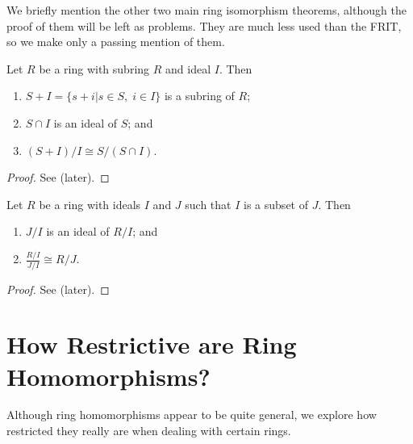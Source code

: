 We briefly mention the other two main ring isomorphism theorems, although the proof of them will be left as problems. They are much less used than the FRIT, so we make only a passing mention of them.
\begin{theorem}\label{thrm-ring-isomorphism-2}
    Let $R$ be a ring with subring $R$ and ideal $I$. Then
    \begin{enumerate}
        \item $S+I = \{s+i \vert s\in S,\;i\in I\}$ is a subring of $R$;
        \item $S \cap I$ is an ideal of $S$; and
        \item $(S+I)/I \cong S/(S\cap I)$.
    \end{enumerate}
\end{theorem}
\begin{proof}
    See  (later).
\end{proof}

\begin{theorem}\label{thrm-ring-isomorphism-3}
    Let $R$ be a ring with ideals $I$ and $J$ such that $I$ is a subset of $J$. Then
    \begin{enumerate}
        \item $J/I$ is an ideal of $R/I$; and
        \item $\frac{R/I}{J/I} \cong R/J$.
    \end{enumerate}
\end{theorem}
\begin{proof}
    See  (later).
\end{proof}

\section{How Restrictive are Ring Homomorphisms?}
Although ring homomorphisms appear to be quite general, we explore how restricted they really are when dealing with certain rings.

